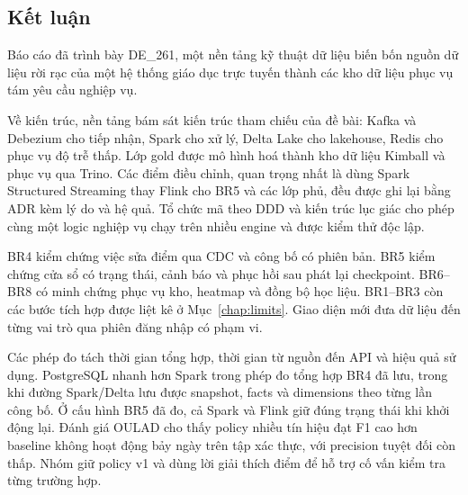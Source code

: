\subsection{Kết luận}
\label{chap:conclusion}

Báo cáo đã trình bày DE\_261, một nền tảng kỹ thuật dữ liệu biến bốn nguồn dữ liệu rời rạc của một hệ thống giáo dục trực tuyến thành các kho dữ liệu phục vụ tám yêu cầu nghiệp vụ.

Về kiến trúc, nền tảng bám sát kiến trúc tham chiếu của đề bài: Kafka và Debezium cho tiếp nhận, Spark cho xử lý, Delta Lake cho lakehouse, Redis cho phục vụ độ trễ thấp. Lớp gold được mô hình hoá thành kho dữ liệu Kimball và phục vụ qua Trino. Các điểm điều chỉnh, quan trọng nhất là dùng Spark Structured Streaming thay Flink cho BR5 và các lớp phủ, đều được ghi lại bằng ADR kèm lý do và hệ quả. Tổ chức mã theo DDD và kiến trúc lục giác cho phép cùng một logic nghiệp vụ chạy trên nhiều engine và được kiểm thử độc lập.

BR4 kiểm chứng việc sửa điểm qua CDC và công bố có phiên bản. BR5 kiểm chứng cửa sổ có trạng thái, cảnh báo và phục hồi sau phát lại checkpoint. BR6--BR8 có minh chứng phục vụ kho, heatmap và đồng bộ học liệu. BR1--BR3 còn các bước tích hợp được liệt kê ở Mục~\ref{chap:limits}. Giao diện mới đưa dữ liệu đến từng vai trò qua phiên đăng nhập có phạm vi.

Các phép đo tách thời gian tổng hợp, thời gian từ nguồn đến API và hiệu quả sử dụng. PostgreSQL nhanh hơn Spark trong phép đo tổng hợp BR4 đã lưu, trong khi đường Spark/Delta lưu được snapshot, facts và dimensions theo từng lần công bố. Ở cấu hình BR5 đã đo, cả Spark và Flink giữ đúng trạng thái khi khởi động lại. Đánh giá OULAD cho thấy policy nhiều tín hiệu đạt F1 cao hơn baseline không hoạt động bảy ngày trên tập xác thực, với precision tuyệt đối còn thấp. Nhóm giữ policy v1 và dùng lời giải thích điểm để hỗ trợ cố vấn kiểm tra từng trường hợp.

